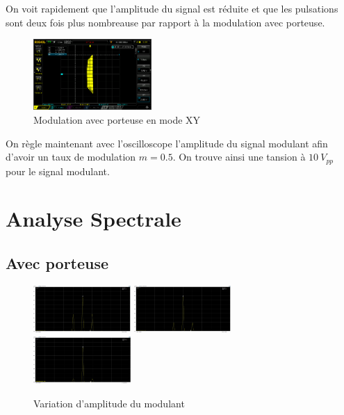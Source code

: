 \documentclass[11pt, openright]{book}
\begin{document}
On voit rapidement que l'amplitude du signal est réduite et que les pulsations sont deux fois plus nombreause par rapport à la modulation avec porteuse.



\begin{figure}[ht]
    \centering
    \includegraphics[width=0.4\textwidth]{./object/g5.png}
    \caption{Modulation avec porteuse en mode XY}
\end{figure}

On règle maintenant avec l'oscilloscope l'amplitude du signal modulant afin d'avoir un taux de modulation $m=0.5$. On trouve ainsi une tansion à $10\ V_{pp}$ pour le signal modulant.

\newpage

\section{Analyse Spectrale}

\subsection{Avec porteuse}
\begin{figure}[ht]
    \centering
    \includegraphics[width=0.33\textwidth]{./object/g7.png}
    \includegraphics[width=0.33\textwidth]{./object/g6.png}
    \includegraphics[width=0.33\textwidth]{./object/g8.png}
    \caption{Variation d'amplitude du modulant}
\end{figure}
\end{document}

